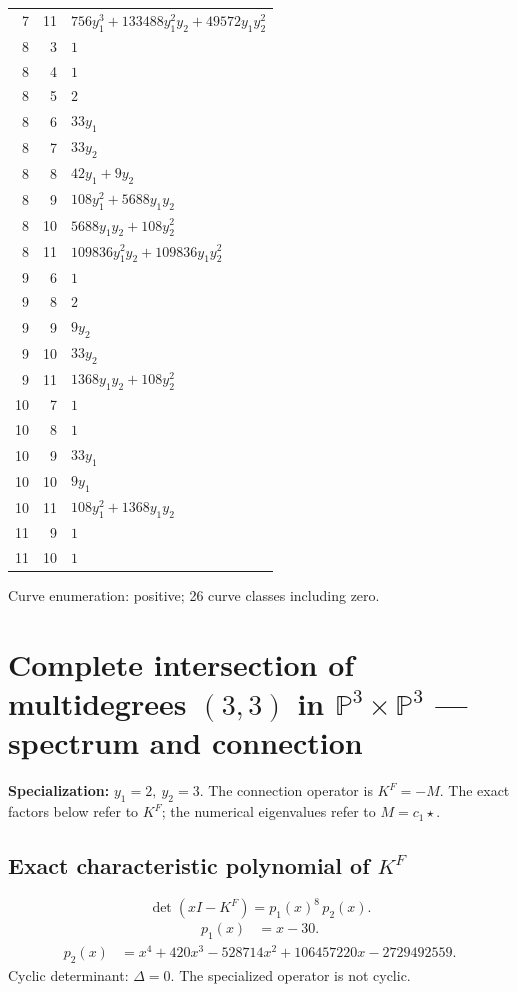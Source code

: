 \documentclass[10pt,a4paper]{article}
\begin{document}
{\begin{longtable}{rrp{125mm}}
7 & 11 & $756 y_{1}^{3} + 133488 y_{1}^{2} y_{2} + 49572 y_{1} y_{2}^{2}$\\
8 & 3 & $1$\\
8 & 4 & $1$\\
8 & 5 & $2$\\
8 & 6 & $33 y_{1}$\\
8 & 7 & $33 y_{2}$\\
8 & 8 & $42 y_{1} + 9 y_{2}$\\
8 & 9 & $108 y_{1}^{2} + 5688 y_{1} y_{2}$\\
8 & 10 & $5688 y_{1} y_{2} + 108 y_{2}^{2}$\\
8 & 11 & $109836 y_{1}^{2} y_{2} + 109836 y_{1} y_{2}^{2}$\\
9 & 6 & $1$\\
9 & 8 & $2$\\
9 & 9 & $9 y_{2}$\\
9 & 10 & $33 y_{2}$\\
9 & 11 & $1368 y_{1} y_{2} + 108 y_{2}^{2}$\\
10 & 7 & $1$\\
10 & 8 & $1$\\
10 & 9 & $33 y_{1}$\\
10 & 10 & $9 y_{1}$\\
10 & 11 & $108 y_{1}^{2} + 1368 y_{1} y_{2}$\\
11 & 9 & $1$\\
11 & 10 & $1$\\
\end{longtable}}
Curve enumeration: positive; 26 curve classes including zero.
\clearpage\section*{Complete intersection of multidegrees $(3,3)$ in $\mathbb P^{3}\times \mathbb P^{3}$ --- spectrum and connection}
\textbf{Specialization:} $y_1=2,\ y_2=3$. The connection operator is $K^F=-M$. The exact factors below refer to $K^F$; the numerical eigenvalues refer to $M=c_1\star$.
\subsection*{Exact characteristic polynomial of $K^F$}
\[\det(xI-K^F)=p_{1}(x)^{8}\,p_{2}(x).\]
\[\begin{aligned}p_{1}(x)&=x - 30.\end{aligned}\]
\[\begin{aligned}p_{2}(x)&=x^{4} + 420 x^{3} - 528714 x^{2} + 106457220 x - 2729492559.\end{aligned}\]
Cyclic determinant: $\Delta=0$. The specialized operator is not cyclic.
\end{document}
